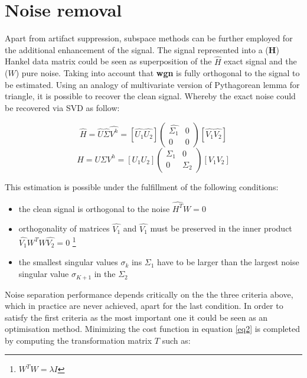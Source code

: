 \section{Noise removal}

Apart from artifact suppression, subspace methods can be further employed for the additional enhancement of the signal. The signal represented into a (\textbf{H}) Hankel data matrix could be seen as superposition of the $\hat{H}$ exact signal and the ($W$) pure noise. Taking into account that \textbf{wgn} is fully orthogonal to the signal to be estimated. Using an analogy of multivariate version of Pythagorean lemma for triangle, it is possible to recover the clean signal. Whereby the exact noise could be recovered via SVD as follow:


\begin{figure}[!htbp]
%
\centering
\begin{equation}
 \hat{H}=\hat{U}\hat{\Sigma}\hat{V^{h}}=[\hat{U_{1}} \hat{U_{2}}]
\begin{pmatrix}
 \hat{\Sigma_{1}}&0\\
 0&0
 \end{pmatrix}
 [\hat{V_{1}} \hat{V_{2}}]
 \end{equation}
\endminipage\hfill
{}%
\centering
 \begin{equation}\label{eq3}
 H=U \Sigma V^{h}=[U_{1} U_{2}]
\begin{pmatrix}
 \Sigma_{1}&0\\
 0&\Sigma_{2}
 \end{pmatrix}
 [V_{1} V_{2}] 
\end{equation}
\endminipage\hfill
\end{figure}

This estimation is possible under the fulfillment of the following conditions:
\begin{itemize}
    \item the clean signal is orthogonal to the noise $\hat{H^{T}}W=0$
    \item orthogonality of matrices $\hat{V_{1}}$ and $\hat{V_{1}}$ must be preserved in the inner product $\hat{V_{1}}W^{T}W\hat{V_{2}}=0$ \footnote{$W^{T}W=\lambda I$} 
    \item the smallest singular values $\sigma_{k}$ ins $\Sigma_{1}$ have to be larger than the largest noise singular value $\sigma_{K+1}$ in the $\Sigma_{2}$    
\end{itemize}

Noise separation performance depends critically on the the three criteria above, which in practice are never achieved, apart for the last condition. In order to satisfy the first criteria as the most important one it could be seen as an optimisation method. Minimizing the cost function in equation \ref{eq2} is completed by computing the transformation matrix $T$ such as:

